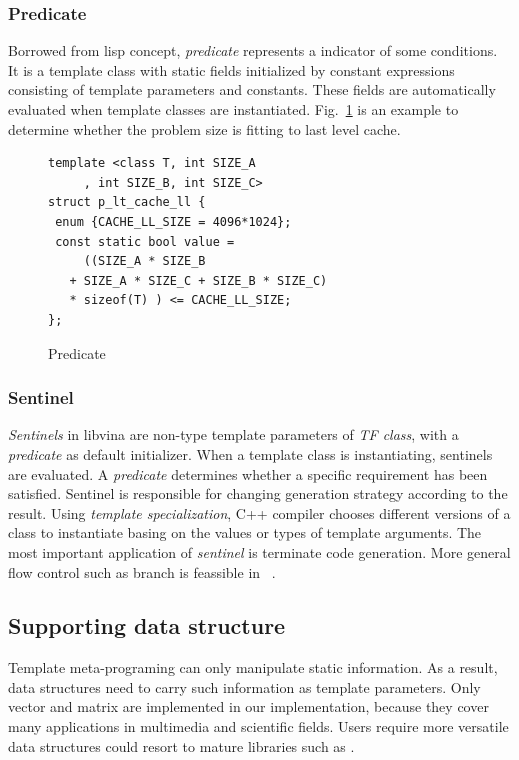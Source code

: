 \documentclass[10pt, conference, compsocconf]{IEEEtran}
\begin{document}
\subsubsection{Predicate}
Borrowed from lisp concept, \emph{predicate} represents a indicator
of some conditions. It is a template class with static
fields initialized by constant expressions consisting of template
parameters and constants. These fields are automatically evaluated
when template classes are instantiated. Fig.~\ref{lst:pred} is an example to determine whether the problem size is fitting to last level cache.

\begin{figure}[!htp]
\begin{minipage}[tb]{\linewidth}
\makebox[\textwidth]{\hrulefill}
\begin{small}
\begin{verbatim}
template <class T, int SIZE_A
     , int SIZE_B, int SIZE_C>
struct p_lt_cache_ll {
 enum {CACHE_LL_SIZE = 4096*1024};
 const static bool value = 
     ((SIZE_A * SIZE_B 
   + SIZE_A * SIZE_C + SIZE_B * SIZE_C) 
   * sizeof(T) ) <= CACHE_LL_SIZE;
};
\end{verbatim}
\end{small}
\vspace{-1ex}\makebox[\textwidth]{\hrulefill}
\end{minipage}
\caption{Predicate}\label{lst:pred}
\end{figure}

\subsubsection{Sentinel}
\emph{Sentinels} in libvina are non-type template parameters of \emph{TF class}, with a \emph{predicate} as default initializer. When a template class is instantiating, sentinels are evaluated.  A \emph{predicate} determines whether a specific requirement has been satisfied. Sentinel is responsible for changing generation strategy according to the result. Using \emph{template specialization}, C++ compiler chooses different versions of a class to instantiate basing on the values or types of template arguments. The most important application of \emph{sentinel} is terminate code generation. More general flow control such as branch is feassible in ~\cite{b16}.

\subsection{Supporting data structure}
Template meta-programing can only manipulate static information. As a
result, data structures need to carry such information as template
parameters. Only vector and matrix are implemented in our implementation,
because they cover many applications in multimedia
and scientific fields. Users require more versatile data structures could resort to
mature libraries such as \cite{b10}. 
\end{document}
